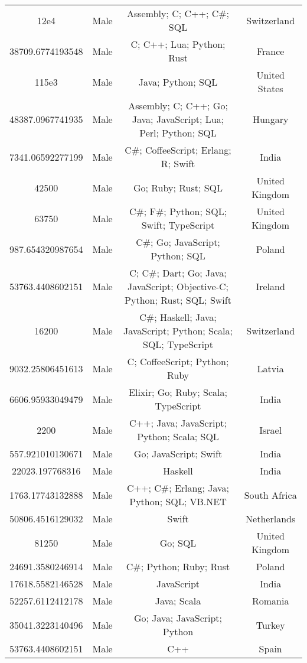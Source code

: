 \begin{center}
\begin{tabular}{ |c|c|c|c| }
12e4  &  Male  &  Assembly; C; C++; C\#; SQL  &  Switzerland  \\ 
38709.6774193548  &  Male  &  C; C++; Lua; Python; Rust  &  France  \\ 
115e3  &  Male  &  Java; Python; SQL  &  United States  \\ 
48387.0967741935  &  Male  &  Assembly; C; C++; Go; Java; JavaScript; Lua; Perl; Python; SQL  &  Hungary  \\ 
7341.06592277199  &  Male  &  C\#; CoffeeScript; Erlang; R; Swift  &  India  \\ 
42500  &  Male  &  Go; Ruby; Rust; SQL  &  United Kingdom  \\ 
63750  &  Male  &  C\#; F\#; Python; SQL; Swift; TypeScript  &  United Kingdom  \\ 
987.654320987654  &  Male  &  C\#; Go; JavaScript; Python; SQL  &  Poland  \\ 
53763.4408602151  &  Male  &  C; C\#; Dart; Go; Java; JavaScript; Objective-C; Python; Rust; SQL; Swift  &  Ireland  \\ 
16200  &  Male  &  C\#; Haskell; Java; JavaScript; Python; Scala; SQL; TypeScript  &  Switzerland  \\ 
9032.25806451613  &  Male  &  C; CoffeeScript; Python; Ruby  &  Latvia  \\ 
6606.95933049479  &  Male  &  Elixir; Go; Ruby; Scala; TypeScript  &  India  \\ 
2200  &  Male  &  C++; Java; JavaScript; Python; Scala; SQL  &  Israel  \\ 
557.921010130671  &  Male  &  Go; JavaScript; Swift  &  India  \\ 
22023.197768316  &  Male  &  Haskell  &  India  \\ 
1763.17743132888  &  Male  &  C++; C\#; Erlang; Java; Python; SQL; VB.NET  &  South Africa  \\ 
50806.4516129032  &  Male  &  Swift  &  Netherlands  \\ 
81250  &  Male  &  Go; SQL  &  United Kingdom  \\ 
24691.3580246914  &  Male  &  C\#; Python; Ruby; Rust  &  Poland  \\ 
17618.5582146528  &  Male  &  JavaScript  &  India  \\ 
52257.6112412178  &  Male  &  Java; Scala  &  Romania  \\ 
35041.3223140496  &  Male  &  Go; Java; JavaScript; Python  &  Turkey  \\ 
53763.4408602151  &  Male  &  C++  &  Spain  \\ 

\end{tabular}
\end{center}
